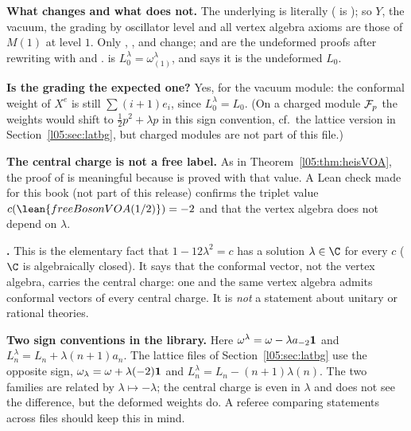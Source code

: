 \begin{dictionary}
\textbf{What changes and what does not.} The underlying  is literally 
( is ); so $Y$, the vacuum, the grading by oscillator level and
all vertex algebra axioms are those of $M(1)$ at level $1$. Only ,
,  and  change;  and
 are the undeformed proofs after rewriting with  and .
 is $L^\lambda_0=\omega^\lambda_{(1)}$, and  says it is
the undeformed $L_0$.

\textbf{Is the grading the expected one?} Yes, for the vacuum module: the conformal weight of
$X^e$ is still $\sum(i+1)e_i$, since $L^\lambda_0=L_0$. (On a charged module $\mathcal{F}_p$ the weights would shift
to $\frac12p^2+\lambda p$ in this sign convention, cf.\ the lattice version in Section~\ref{l05:sec:latbg}, but charged modules are
not part of this file.)

\textbf{The central charge is not a free label.} As in Theorem~\ref{l05:thm:heisVOA}, the  proof of
 is meaningful because  is proved with that value. A
Lean check made for this book (not part of this release) confirms the triplet value
$c(\lean{freeBosonVOA (1/2)})=-2$ and that the vertex algebra does not depend on $\lambda$.

\textbf{.} This is the elementary fact that $1-12\lambda^2=c$ has a solution
$\lambda\in\C$ for every $c$ ($\C$ is algebraically closed). It says that the conformal vector, not the vertex
algebra, carries the central charge: one and the same vertex algebra admits conformal vectors of every central
charge. It is \emph{not} a statement about unitary or rational theories.

\textbf{Two sign conventions in the library.} Here $\omega^\lambda=\omega-\lambda a_{-2}\mathbf{1}$ and
$L^\lambda_n=L_n+\lambda(n+1)a_n$. The lattice files of Section~\ref{l05:sec:latbg} use the opposite sign,
$\omega_\lambda=\omega+\lambda(-2)\mathbf{1}$ and $L^\lambda_n=L_n-(n+1)\lambda(n)$. The two families are related by
$\lambda\mapsto-\lambda$; the central charge is even in $\lambda$ and does not see the difference, but the
deformed weights do. A referee comparing statements across files should keep this in mind.
\end{dictionary}

